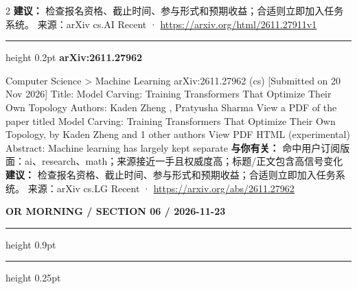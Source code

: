 \documentclass[10.5pt]{ctexart}
\begin{document}
\begin{multicols}{2}
\textbf{建议：} 检查报名资格、截止时间、参与形式和预期收益；合适则立即加入任务系统。
{\footnotesize\color{ormuted} 来源：arXiv cs.AI Recent · \url{https://arxiv.org/html/2611.27911v1}}
\vspace{2mm}
\hrule height 0.2pt
\vspace{2mm}
{\large\bfseries arXiv:2611.27962}\par
Computer Science > Machine Learning arXiv:2611.27962 (cs) [Submitted on 20 Nov 2026] Title: Model Carving: Training Transformers That Optimize Their Own Topology Authors: Kaden Zheng , Pratyusha Sharma View a PDF of the paper titled Model Carving: Training Transformers That Optimize Their Own Topology, by Kaden Zheng and 1 other authors View PDF HTML (experimental) Abstract: Machine learning has largely kept separate
\textbf{与你有关：} 命中用户订阅版面：ai、research、math；来源接近一手且权威度高；标题/正文包含高信号变化
\textbf{建议：} 检查报名资格、截止时间、参与形式和预期收益；合适则立即加入任务系统。
{\footnotesize\color{ormuted} 来源：arXiv cs.LG Recent · \url{https://arxiv.org/abs/2611.27962}}
\end{multicols}
\newpage
{\small\bfseries OR MORNING / SECTION 06 / 2026-11-23}
\vspace{2mm}
\hrule height 0.9pt
\vspace{1.5mm}
\hrule height 0.25pt
\vspace{4mm}
\end{document}
